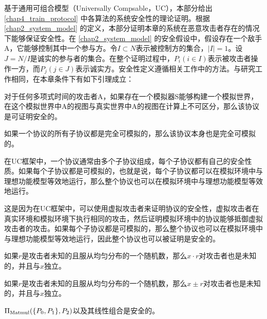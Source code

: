基于通用可组合模型\cite{Universally_Compsable, Simple_UC}（Universally Compsable，UC），本部分给出 \ref{chap4_train_protocol} 中各算法的系统安全性的理论证明。根据 \ref{chap2_system_model} 的定义，本部分证明本章的系统在恶意攻击者存在的情况下能够保证安全性。在 \ref{chap2_system_model} 的安全假设中，假设存在一个敌手A，它能够控制其中一个参与方。令$I\subset N$表示被控制方的集合，$|I|=1$。设$J = N / I$是诚实的参与者的集合。在整个证明过程中，$P_i  (i∈I)$表示被攻击者操作一方，而$P_j  (j∈J)$表示诚实方。安全性定义遵循相关工作中的方法。与研究工作\cite{SecureNLP, Sim_Proof, Sharemind}相同，在本章条件下有如下引理成立：

\begin{definition}{}
	对于任何多项式时间的攻击者A，如果存在一个模拟器S能够构建一个模拟世界，在这个模拟世界中A的视图与真实世界中A的视图在计算上不可区分，那么该协议是可证明安全的。
\end{definition}


\begin{lemma}
	如果一个协议的所有子协议都是完全可模拟的，那么该协议本身也是完全可模拟的。
\end{lemma}


在UC框架中，一个协议通常由多个子协议组成，每个子协议都有自己的安全性质。如果每个子协议都是可模拟的，也就是说，每个子协议都可以在模拟环境中与理想功能模型等效地运行，那么整个协议也可以在模拟环境中与理想功能模型等效地运行。

这是因为在UC框架中，可以使用虚拟攻击者来证明协议的安全性，虚拟攻击者在真实环境和模拟环境下执行相同的攻击，然后证明模拟环境中的协议能够抵御虚拟攻击者的攻击。如果每个子协议都是可模拟的，那么整个协议也可以在模拟环境中与理想功能模型等效地运行，因此整个协议也可以被证明是安全的。%

\begin{lemma}
	如果$r$是攻击者未知的且服从均匀分布的一个随机数，那么$x\cdot r$对攻击者也是未知的，并且与$x$独立。
\end{lemma}

\begin{lemma} \label{ss_pm}
	如果$r$是攻击者未知的且服从均匀分布的一个随机数，那么$x\pm r$对攻击者也是未知的，并且与$x$独立。
\end{lemma}

\begin{lemma} \label{ss_matmul}
	$\Pi_{\rm Matmul}(\{P_0, P_1\}, P_2)$以及其线性组合是安全的\cite{Threshold_ECDSA, beaver_efficient}。
\end{lemma}

